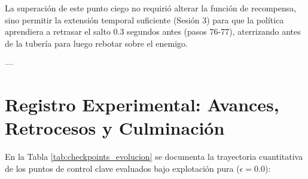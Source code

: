 \documentclass[11pt,letterpaper]{article}
\begin{document}
La superación de este punto ciego no requirió alterar la función de recompensa, sino permitir la extensión temporal suficiente (Sesión 3) para que la política aprendiera a retrasar el salto 0.3 segundos antes (pasos 76-77), aterrizando antes de la tubería para luego rebotar sobre el enemigo.

---

\section{Registro Experimental: Avances, Retrocesos y Culminación}

En la Tabla \ref{tab:checkpoints_evolucion} se documenta la trayectoria cuantitativa de los puntos de control clave evaluados bajo explotación pura ($\epsilon = 0.0$):
\end{document}
